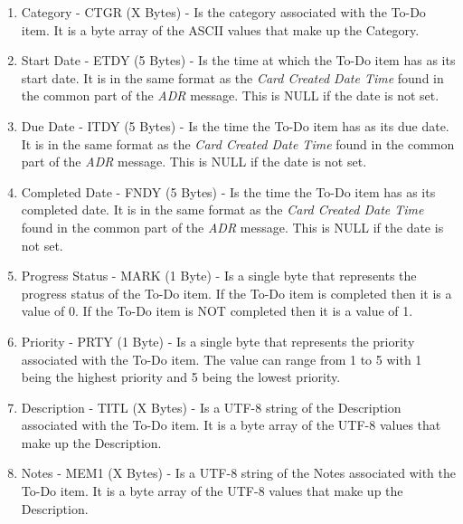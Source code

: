             \begin{enumerate}
              \item Category - CTGR (X Bytes) - Is the category associated
              with the To-Do item. It is a byte array of the ASCII values that
              make up the Category.

              \item Start Date - ETDY (5 Bytes) - Is the time at which the
              To-Do item has as its start date. It is in the same format as the
              \emph{Card Created Date Time} found in the common part of the
              \emph{ADR} message. This is NULL if the date is not set.

              \item Due Date - ITDY (5 Bytes) - Is the time the To-Do item has
              as its due date. It is in the same format as the
              \emph{Card Created Date Time} found in the common part of the
              \emph{ADR} message. This is NULL if the date is not set.

              \item Completed Date - FNDY (5 Bytes) - Is the time the To-Do
              item has as its completed date. It is in the same format as the
              \emph{Card Created Date Time} found in the common part of the
              \emph{ADR} message. This is NULL if the date is not set.

              \item Progress Status - MARK (1 Byte) - Is a single byte that
              represents the progress status of the To-Do item. If the To-Do
              item is completed then it is a value of 0. If the To-Do item is
              NOT completed then it is a value of 1.

              \item Priority - PRTY (1 Byte) - Is a single byte that
              represents the priority associated with the To-Do item. The value
              can range from 1 to 5 with 1 being the highest priority and 5
              being the lowest priority.

              \item Description - TITL (X Bytes) - Is a UTF-8 string of the
              Description associated with the To-Do item. It is a byte array of
              the UTF-8 values that make up the Description.

              \item Notes - MEM1 (X Bytes) - Is a UTF-8 string of the Notes
              associated with the To-Do item. It is a byte array of the UTF-8
              values that make up the Description.
            \end{enumerate}

